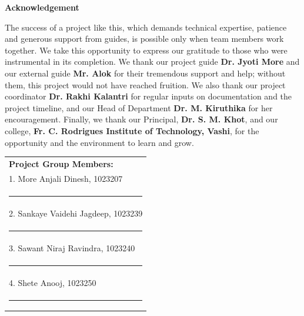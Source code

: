 
\begin{centering}
{\LARGE\bfseries Acknowledgement}\\
\end{centering}

\vspace{0.5cm}
\justify
The success of a project like this, which demands technical expertise, patience and generous support from guides, is possible only when team members work together. We take this opportunity to express our gratitude to those who were instrumental in its completion. We thank our project guide \textbf{Dr. Jyoti More} and our external guide \textbf{Mr. Alok} for their tremendous support and help; without them, this project would not have reached fruition. We also thank our project coordinator \textbf{Dr. Rakhi Kalantri} for regular inputs on documentation and the project timeline, and our Head of Department \textbf{Dr. M. Kiruthika} for her encouragement. Finally, we thank our Principal, \textbf{Dr. S. M. Khot}, and our college, \textbf{Fr. C. Rodrigues Institute of Technology, Vashi}, for the opportunity and the environment to learn and grow.

\vspace{3cm}
\hfill
\begin{tabular}[t]{l@{}}
\textbf{Project Group Members:} \\[1cm]
1. More Anjali Dinesh, 1023207 \\[0.9cm]
\rule{5cm}{0.4pt} \\[0.8cm]
2. Sankaye Vaidehi Jagdeep, 1023239 \\[0.9cm]
\rule{5cm}{0.4pt} \\[0.8cm]
3. Sawant Niraj Ravindra, 1023240 \\[0.9cm]
\rule{5cm}{0.4pt} \\[0.8cm]
4. Shete Anooj, 1023250 \\[0.9cm]
\rule{5cm}{0.4pt}
\end{tabular}
